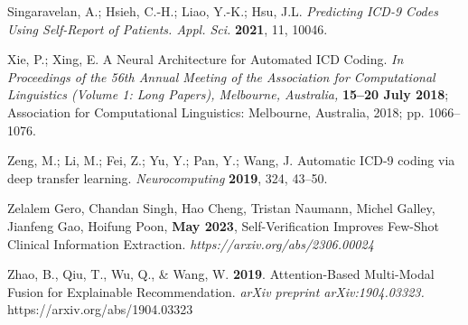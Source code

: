 \documentclass[journal,article,submit,pdftex,moreauthors]{Definitions/mdpi}
\begin{document}
\begin{thebibliography}{999}
Singaravelan, A.; Hsieh, C.-H.; Liao, Y.-K.; Hsu, J.L. {\em Predicting ICD-9 Codes Using Self-Report of Patients. Appl. Sci.} {\bf 2021}, 11, 10046.

Xie, P.; Xing, E. A Neural Architecture for Automated ICD Coding. {\em In Proceedings of the 56th Annual Meeting of the Association for Computational Linguistics (Volume 1: Long Papers), Melbourne, Australia,} {\bf 15–20 July 2018}; Association for Computational Linguistics: Melbourne, Australia, 2018; pp. 1066–1076.

Zeng, M.; Li, M.; Fei, Z.; Yu, Y.; Pan, Y.; Wang, J. Automatic ICD-9 coding via deep transfer learning. {\em Neurocomputing} {\bf 2019}, 324, 43–50.

Zelalem Gero, Chandan Singh, Hao Cheng, Tristan Naumann, Michel Galley, Jianfeng Gao, Hoifung Poon, {\bf May 2023}, Self-Verification Improves Few-Shot Clinical Information Extraction. {\em https://arxiv.org/abs/2306.00024 }

Zhao, B., Qiu, T., Wu, Q., & Wang, W. {\bf 2019}. Attention-Based Multi-Modal Fusion for Explainable Recommendation. {\em arXiv preprint arXiv:1904.03323.} https://arxiv.org/abs/1904.03323

\end{thebibliography}

%


\PublishersNote{}
\end{document}
